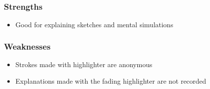 \documentclass[12pt,fleqn]{ucithesis}
\begin{document}
\subsubsection{Strengths}

\begin{itemize}
	\item Good for explaining sketches and mental simulations
\end{itemize}


\subsubsection{Weaknesses}	

\begin{itemize}
	\item Strokes made with highlighter are anonymous
	\item Explanations made with the fading highlighter are not recorded
\end{itemize}


	
\end{document}

